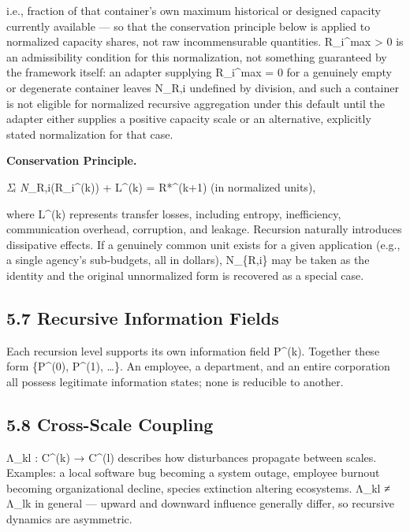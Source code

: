 \documentclass[
]{article}
\begin{document}
i.e., fraction of that container's own maximum historical or designed
capacity currently available --- so that the conservation principle
below is applied to normalized capacity shares, not raw incommensurable
quantities. R\_i\^{}max \textgreater{} 0 is an admissibility condition
for this normalization, not something guaranteed by the framework
itself: an adapter supplying R\_i\^{}max = 0 for a genuinely empty or
degenerate container leaves N\_R,i undefined by division, and such a
container is not eligible for normalized recursive aggregation under
this default until the adapter either supplies a positive capacity scale
or an alternative, explicitly stated normalization for that case.

\textbf{Conservation Principle.}

\emph{Σᵢ N}\_R,i(R\_i\^{}(k)) + L\^{}(k) = R*\^{}(k+1) (in normalized
units),

where L\^{}(k) represents transfer losses, including entropy,
inefficiency, communication overhead, corruption, and leakage. Recursion
naturally introduces dissipative effects. If a genuinely common unit
exists for a given application (e.g., a single agency's sub-budgets, all
in dollars), N\_\{R,i\} may be taken as the identity and the original
unnormalized form is recovered as a special case.

\hypertarget{recursive-information-fields}{%
\subsection{5.7 Recursive Information
Fields}\label{recursive-information-fields}}

Each recursion level supports its own information field P\^{}(k).
Together these form \{P\^{}(0), P\^{}(1), \ldots\}. An employee, a
department, and an entire corporation all possess legitimate information
states; none is reducible to another.

\hypertarget{cross-scale-coupling}{%
\subsection{5.8 Cross-Scale Coupling}\label{cross-scale-coupling}}

Λ\_kl : C\^{}(k) → C\^{}(l) describes how disturbances propagate between
scales. Examples: a local software bug becoming a system outage,
employee burnout becoming organizational decline, species extinction
altering ecosystems. Λ\_kl ≠ Λ\_lk in general --- upward and downward
influence generally differ, so recursive dynamics are asymmetric.
\end{document}
